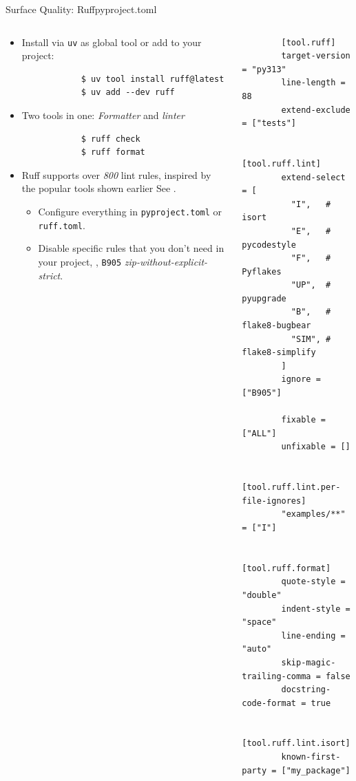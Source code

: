 \begin{splitframe}[fragile]{Surface Quality: Ruff}{pyproject.toml}
  \begin{columns}[t,onlytextwidth]
    \begin{column}{0.58\textwidth}
      {
      \begin{itemize}
        \setlength{\itemsep}{2.5em}
        \item Install via \texttt{uv} as global tool or add to your project:
          \begin{verbatim}
            $ uv tool install ruff@latest
            $ uv add --dev ruff
          \end{verbatim}
        \item Two tools in one: \emph{Formatter} and \emph{linter}
          \begin{verbatim}
            $ ruff check
            $ ruff format
          \end{verbatim}
        \item Ruff supports over \emph{800} lint rules, inspired by the popular tools
          shown earlier \to{} See .
          \begin{itemize}
            \setlength{\itemsep}{1em}
            \item [\to] Configure everything in \texttt{pyproject.toml} or \texttt{ruff.toml}.
            \item [\to] Disable specific rules that you don't need in your project, \eg, \texttt{B905} \textit{zip-without-explicit-strict}.
          \end{itemize}
      \end{itemize}
      }
    \end{column}
    \hfill
    \begin{column}{0.38\textwidth}
      \footnotesize
      \vspace*{0.25cm}
      \begin{verbatim}
        [tool.ruff]
        target-version = "py313"
        line-length = 88
        extend-exclude = ["tests"]

        [tool.ruff.lint]
        extend-select = [
          "I",   # isort
          "E",   # pycodestyle
          "F",   # Pyflakes
          "UP",  # pyupgrade
          "B",   # flake8-bugbear
          "SIM", # flake8-simplify
        ]
        ignore = ["B905"]

        fixable = ["ALL"]
        unfixable = []

        [tool.ruff.lint.per-file-ignores]
        "examples/**" = ["I"]

        [tool.ruff.format]
        quote-style = "double"
        indent-style = "space"
        line-ending = "auto"
        skip-magic-trailing-comma = false
        docstring-code-format = true

        [tool.ruff.lint.isort]
        known-first-party = ["my_package"]
      \end{verbatim}
    \end{column}
  \end{columns}
\end{splitframe}

